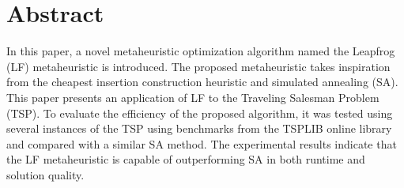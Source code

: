 \documentclass[12pt,letterpaper,oneside]{book}
\begin{document}
\frontmatter
	\flyleaf                        
	
\mainmatter
\chapter*{Abstract}
In this paper, a novel metaheuristic optimization algorithm named the Leapfrog (LF) metaheuristic is introduced. The proposed metaheuristic takes inspiration from the cheapest insertion construction heuristic and simulated annealing (SA). This paper presents an application of LF to the Traveling Salesman Problem (TSP). To evaluate the efficiency of the proposed algorithm, it was tested using several instances of the TSP using benchmarks from the TSPLIB online library and compared with a similar SA method. The experimental results indicate that the LF metaheuristic is capable of outperforming SA in both runtime and solution quality.
\tableofcontents
\end{document}
